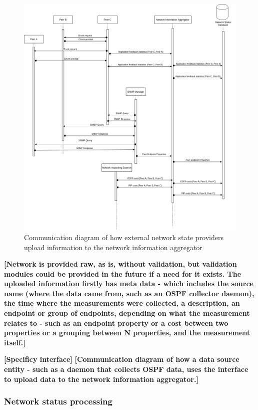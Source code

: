\begin{figure}[!h]
        \centering
        \includegraphics[scale=0.3]{img/info-provisioning-providers.png}
        \caption{Communication diagram of how external network state providers upload information to the network information aggregator}
        \label{fig:architecture-network}
\end{figure}


    \textbf{[Network is provided raw, as is, without validation, but validation modules could be provided in the future if a need for it exists. The uploaded information firstly has meta data - which includes the source name (where the data came from, such as an OSPF collector daemon), the time where the measurements were collected, a description, an endpoint or group of endpoints, depending on what the measurement relates to - such as an endpoint property or a cost between two properties or a grouping between N properties, and the measurement itself.]}

    \textbf{[Specificy interface]}
    \textbf{[Communication diagram of how a data source entity - such as a daemon that collects OSPF data, uses the interface to upload data to the network information aggregator.]}

\subsubsection{Network status processing}

